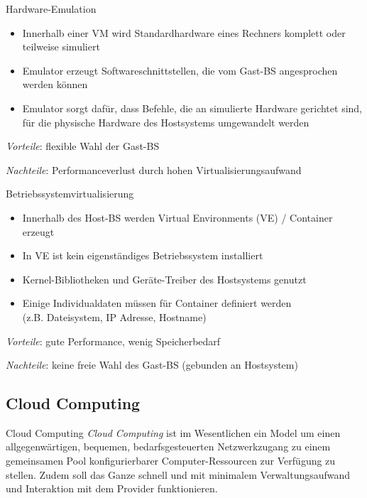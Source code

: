 \documentclass[german]{../spicker}
\begin{document}
\begin{defi}{Hardware-Emulation}
    \begin{itemize}
        \item Innerhalb einer VM wird Standardhardware eines Rechners komplett oder teilweise simuliert
        \item Emulator erzeugt Softwareschnittstellen, die vom Gast-BS angesprochen werden können
        \item Emulator sorgt dafür, dass Befehle, die an simulierte Hardware gerichtet sind, für die physische Hardware des Hostsystems umgewandelt werden
    \end{itemize}

    \emph{Vorteile}: flexible Wahl der Gast-BS

    \emph{Nachteile}: Performanceverlust durch hohen Virtualisierungsaufwand
\end{defi}

\begin{defi}{Betriebssystemvirtualisierung}
    \begin{itemize}
        \item Innerhalb des Host-BS werden Virtual Environments (VE) / Container erzeugt
        \item In VE ist kein eigenständiges Betriebssystem installiert
        \item Kernel-Bibliotheken und Geräte-Treiber des Hostsystems genutzt
        \item Einige Individualdaten müssen für Container definiert werden \\ (z.B. Dateisystem, IP Adresse, Hostname)
    \end{itemize}

    \emph{Vorteile}: gute Performance, wenig Speicherbedarf

    \emph{Nachteile}: keine freie Wahl des Gast-BS (gebunden an Hostsystem)
\end{defi}

\subsection{Cloud Computing}

\begin{defi}{Cloud Computing}
    \emph{Cloud Computing} ist im Wesentlichen ein Model um einen allgegenwärtigen,
    bequemen, bedarfsgesteuerten Netzwerkzugang zu einem gemeinsamen Pool konfigurierbarer
    Computer-Ressourcen zur Verfügung zu stellen. Zudem soll das Ganze
    schnell und mit minimalem Verwaltungsaufwand und Interaktion mit dem Provider
    funktionieren.
\end{defi}
\end{document}
